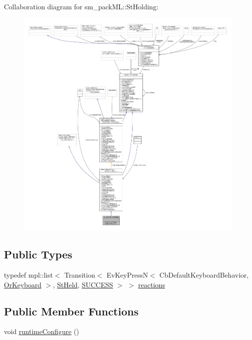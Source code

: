 Collaboration diagram for sm\+\_\+pack\+ML\+:\+:St\+Holding\+:
\nopagebreak
\begin{figure}[H]
\begin{center}
\leavevmode
\includegraphics[width=350pt]{structsm__packML_1_1StHolding__coll__graph}
\end{center}
\end{figure}
\subsection*{Public Types}
\begin{DoxyCompactItemize}
\item 
typedef mpl\+::list$<$ Transition$<$ Ev\+Key\+PressN$<$ Cb\+Default\+Keyboard\+Behavior, \hyperlink{classsm__packML_1_1OrKeyboard}{Or\+Keyboard} $>$, \hyperlink{structsm__packML_1_1StHeld}{St\+Held}, \hyperlink{classSUCCESS}{S\+U\+C\+C\+E\+SS} $>$ $>$ \hyperlink{structsm__packML_1_1StHolding_a1189afef659b1cb4e7b5e0b0024ce362}{reactions}
\end{DoxyCompactItemize}
\subsection*{Public Member Functions}
\begin{DoxyCompactItemize}
\item 
void \hyperlink{structsm__packML_1_1StHolding_a5534f6aeff3d2f5a0d5db2f0f0cd10f3}{runtime\+Configure} ()
\end{DoxyCompactItemize}
